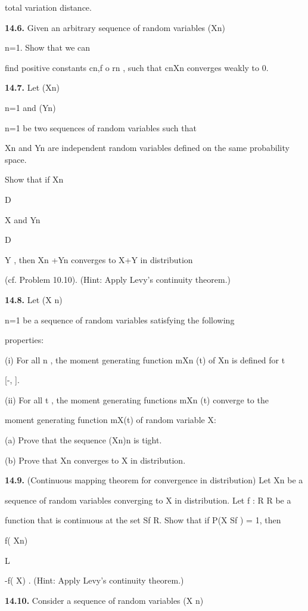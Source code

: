 total variation distance.

\textbf{14.6.} Given an arbitrary sequence of random variables (Xn)\infty

n=1. Show that we can

find positive constants cn,f o rn , such that cnXn converges weakly to 0.

\textbf{14.7.} Let (Xn)\infty

n=1 and (Yn)\infty

n=1 be two sequences of random variables such that

Xn and Yn are independent random variables defined on the same probability space.

Show that if Xn

D

\to X and Yn

D

\to Y , then Xn +Yn converges to X+Y in distribution

(cf. Problem 10.10). (Hint: Apply Levy's continuity theorem.)

\textbf{14.8.} Let (X n)\infty

n=1 be a sequence of random variables satisfying the following

properties:

(i) For all n , the moment generating function mXn (t) of Xn is defined for t \in

[-\delta, \delta].

(ii) For all t \in[ - \delta, \delta], the moment generating functions mXn (t) converge to the

moment generating function mX(t) of random variable X:

(a) Prove that the sequence (Xn)n is tight.

(b) Prove that Xn converges to X in distribution.

\textbf{14.9.} (Continuous mapping theorem for convergence in distribution) Let Xn be a

sequence of random variables converging to X in distribution. Let f : R \to R be a

function that is continuous at the set Sf \subseteq R. Show that if P(X \in Sf ) = 1, then

f( Xn)

L

-\to f( X) . (Hint: Apply Levy's continuity theorem.)

\textbf{14.10.} Consider a sequence of random variables (X n)\infty

